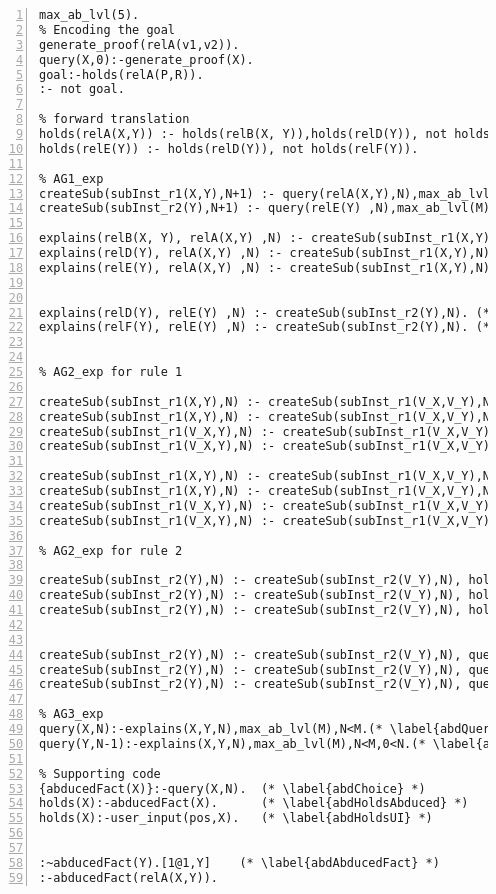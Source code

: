 \begin{lstlisting}[numbers=left]
max_ab_lvl(5).
% Encoding the goal
generate_proof(relA(v1,v2)).
query(X,0):-generate_proof(X).
goal:-holds(relA(P,R)).
:- not goal.

% forward translation
holds(relA(X,Y)) :- holds(relB(X, Y)),holds(relD(Y)), not holds(relE(Y)).
holds(relE(Y)) :- holds(relD(Y)), not holds(relF(Y)).

% AG1_exp
createSub(subInst_r1(X,Y),N+1) :- query(relA(X,Y),N),max_ab_lvl(M),N<M-1. (* \label{abdInstR1} *)
createSub(subInst_r2(Y),N+1) :- query(relE(Y) ,N),max_ab_lvl(M),N<M-1. (* \label{abdInstR2} *)

explains(relB(X, Y), relA(X,Y) ,N) :- createSub(subInst_r1(X,Y),N). (* \label{abdExplR1start} *)
explains(relD(Y), relA(X,Y) ,N) :- createSub(subInst_r1(X,Y),N).
explains(relE(Y), relA(X,Y) ,N) :- createSub(subInst_r1(X,Y),N). (* \label{abdExplR1end} *)


explains(relD(Y), relE(Y) ,N) :- createSub(subInst_r2(Y),N). (* \label{abdExplR2start} *)
explains(relF(Y), relE(Y) ,N) :- createSub(subInst_r2(Y),N). (* \label{abdExplR2end} *)


% AG2_exp for rule 1

createSub(subInst_r1(X,Y),N) :- createSub(subInst_r1(V_X,V_Y),N), holds(relA(X,Y)).
createSub(subInst_r1(X,Y),N) :- createSub(subInst_r1(V_X,V_Y),N), holds(relB(X,Y)).
createSub(subInst_r1(V_X,Y),N) :- createSub(subInst_r1(V_X,V_Y),N), holds(relD(Y)).
createSub(subInst_r1(V_X,Y),N) :- createSub(subInst_r1(V_X,V_Y),N), holds(relE(Y)).

createSub(subInst_r1(X,Y),N) :- createSub(subInst_r1(V_X,V_Y),N), query(relA(X,Y),L).
createSub(subInst_r1(X,Y),N) :- createSub(subInst_r1(V_X,V_Y),N), query(relB(X,Y),L).
createSub(subInst_r1(V_X,Y),N) :- createSub(subInst_r1(V_X,V_Y),N), query(relD(Y),L).
createSub(subInst_r1(V_X,Y),N) :- createSub(subInst_r1(V_X,V_Y),N), query(relE(Y),L).

% AG2_exp for rule 2

createSub(subInst_r2(Y),N) :- createSub(subInst_r2(V_Y),N), holds(relE(Y)).
createSub(subInst_r2(Y),N) :- createSub(subInst_r2(V_Y),N), holds(relD(Y)).
createSub(subInst_r2(Y),N) :- createSub(subInst_r2(V_Y),N), holds(relF(Y)).


createSub(subInst_r2(Y),N) :- createSub(subInst_r2(V_Y),N), query(relE(Y),L).
createSub(subInst_r2(Y),N) :- createSub(subInst_r2(V_Y),N), query(relD(Y),L).
createSub(subInst_r2(Y),N) :- createSub(subInst_r2(V_Y),N), query(relF(Y),L).

% AG3_exp
query(X,N):-explains(X,Y,N),max_ab_lvl(M),N<M.(* \label{abdQuery} *)
query(Y,N-1):-explains(X,Y,N),max_ab_lvl(M),N<M,0<N.(* \label{abdAbdHold} *)

% Supporting code
{abducedFact(X)}:-query(X,N).  (* \label{abdChoice} *)
holds(X):-abducedFact(X).      (* \label{abdHoldsAbduced} *)
holds(X):-user_input(pos,X).   (* \label{abdHoldsUI} *)


:~abducedFact(Y).[1@1,Y]    (* \label{abdAbducedFact} *)
:-abducedFact(relA(X,Y)).

\end{lstlisting}



